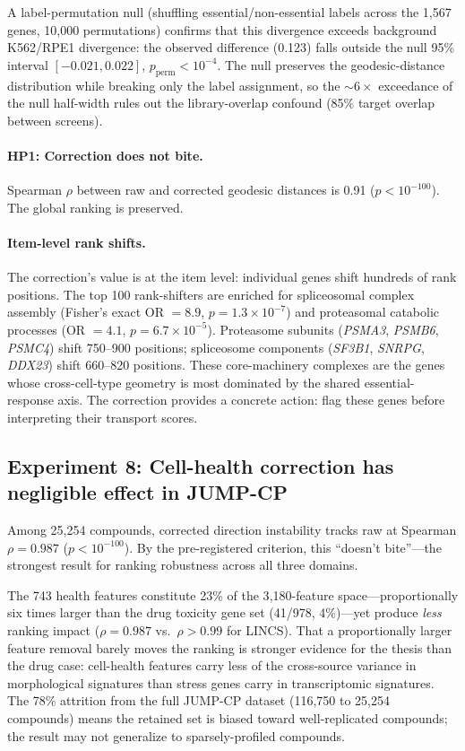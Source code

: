 \documentclass[10pt]{article}
\begin{document}
A label-permutation null (shuffling essential/non-essential labels across
the 1{,}567 genes, 10{,}000 permutations) confirms that this divergence
exceeds background K562/RPE1 divergence: the observed difference (0.123)
falls outside the null 95\% interval $[-0.021, 0.022]$,
$p_{\text{perm}} < 10^{-4}$. The null preserves the geodesic-distance
distribution while breaking only the label assignment, so the ${\sim}6\times$
exceedance of the null half-width rules out the library-overlap confound
(85\% target overlap between screens).

\paragraph{HP1: Correction does not bite.}
Spearman $\rho$ between raw and corrected geodesic distances is 0.91
($p < 10^{-100}$). The global ranking is preserved.

\paragraph{Item-level rank shifts.}
The correction's value is at the item level: individual genes shift
hundreds of rank positions. The top 100 rank-shifters are enriched for
spliceosomal complex assembly (Fisher's exact OR $= 8.9$,
$p = 1.3 \times 10^{-7}$) and proteasomal catabolic processes
(OR $= 4.1$, $p = 6.7 \times 10^{-5}$). Proteasome subunits
(\emph{PSMA3}, \emph{PSMB6}, \emph{PSMC4}) shift 750--900 positions;
spliceosome components (\emph{SF3B1}, \emph{SNRPG}, \emph{DDX23}) shift
660--820 positions. These core-machinery complexes are the genes whose
cross-cell-type geometry is most dominated by the shared essential-response
axis. The correction provides a concrete action: flag these genes before
interpreting their transport scores.

\subsection{Experiment 8: Cell-health correction has negligible
effect in JUMP-CP}

Among 25{,}254 compounds, corrected direction instability tracks raw
at Spearman $\rho = 0.987$ ($p < 10^{-100}$). By the pre-registered
criterion, this ``doesn't bite''---the strongest result for ranking
robustness across all three domains.

The 743 health features constitute 23\% of the 3{,}180-feature
space---proportionally six times larger than the drug toxicity gene set
(41/978, 4\%)---yet produce \emph{less} ranking impact ($\rho = 0.987$
vs.\ $\rho > 0.99$ for LINCS). That a proportionally larger feature
removal barely moves the ranking is stronger evidence for the thesis than
the drug case: cell-health features carry less of the cross-source
variance in morphological signatures than stress genes carry in
transcriptomic signatures. The 78\% attrition from the full JUMP-CP
dataset (116{,}750 to 25{,}254 compounds) means the retained set is
biased toward well-replicated compounds; the result may not generalize
to sparsely-profiled compounds.
\end{document}

